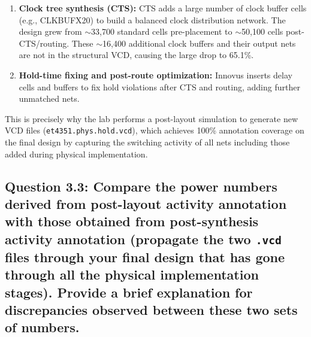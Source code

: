 \documentclass{article}
\begin{document}
\begin{tcolorbox}[colback=white, colframe=black, width=\textwidth, title=Answer 3.2]
\begin{enumerate}
\item \textbf{Clock tree synthesis (CTS):} CTS adds a large number of clock buffer cells (e.g., CLKBUFX20) to build a balanced clock distribution network. The design grew from $\sim$33{,}700 standard cells pre-placement to $\sim$50{,}100 cells post-CTS/routing. These $\sim$16{,}400 additional clock buffers and their output nets are not in the structural VCD, causing the large drop to 65.1\%.

\item \textbf{Hold-time fixing and post-route optimization:} Innovus inserts delay cells and buffers to fix hold violations after CTS and routing, adding further unmatched nets.
\end{enumerate}

This is precisely why the lab performs a post-layout simulation to generate new VCD files (\texttt{et4351.phys.hold.vcd}), which achieves 100\% annotation coverage on the final design by capturing the switching activity of all nets including those added during physical implementation.

\end{tcolorbox}

\newpage

\subsection*{Question 3.3: Compare the power numbers derived from post-layout activity annotation with those obtained from post-synthesis activity annotation (propagate the two \texttt{.vcd} files through your final design that has gone through all the physical implementation stages). Provide a brief explanation for discrepancies observed between these two sets of numbers.}
\end{document}
